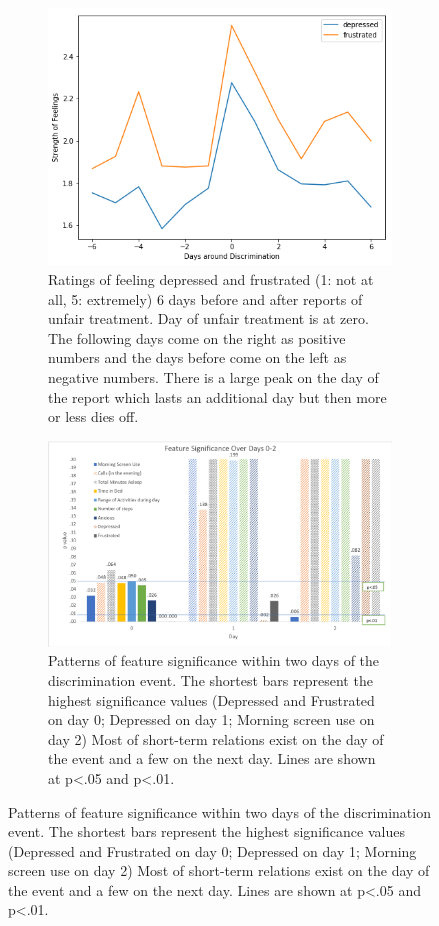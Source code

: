 \begin{figure}
     \centering

\begin{subfigure}[t]{0.49\textwidth}
    \centering
    \includegraphics[width=\textwidth]{img/affect-beforeafter.png}
    \caption[Affect ratings before and after unfair treatment]{Ratings of feeling depressed and frustrated (1: not at all, 5: extremely) 6 days before and after reports of unfair treatment. Day of unfair treatment is at zero. The following days come on the right as positive numbers and the days before come on the left as negative numbers. There is a large peak on the day of the report which lasts an additional day but then more or less dies off.
    }
    \label{fig:reeults-affect-dieoff}
\end{subfigure}
\hfill
\begin{subfigure}[t]{0.49\textwidth}
    \centering
    \includegraphics[width=\textwidth]{img/feature-significance}
    \caption[Feature significance over time]{Patterns of feature significance within two days of the discrimination event. The shortest bars represent the highest significance values (\eg Depressed and Frustrated on day 0; Depressed on day 1; Morning screen use on day 2) Most of short-term relations exist on the day of the event and a few on the next day.  Lines are shown at p<.05 and p<.01.}
    \label{fig:die-off}
\end{subfigure}

\end{figure}

